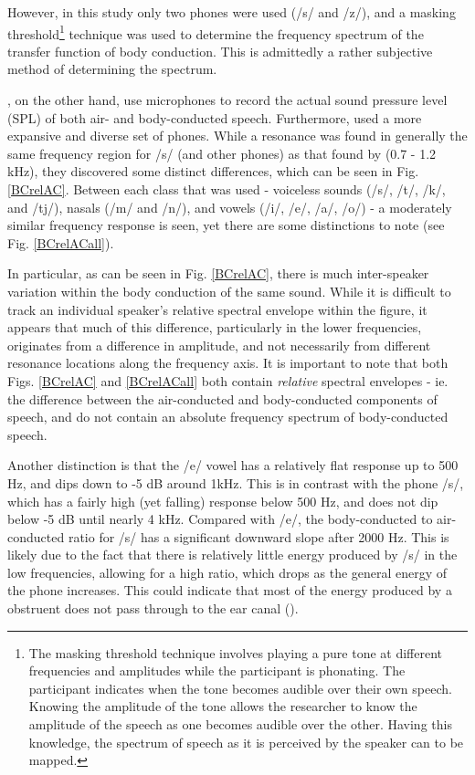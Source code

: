 However, in this study only two phones were used (/s/ and /z/), and a masking threshold\footnote{The masking threshold technique involves playing a pure tone at different frequencies and amplitudes while the participant is phonating. The participant indicates when the tone becomes audible over their own speech. Knowing the amplitude of the tone allows the researcher to know the amplitude of the speech as one becomes audible over the other. Having this knowledge, the spectrum of speech as it is perceived by the speaker can to be mapped.} technique was used to determine the frequency spectrum of the transfer function of body conduction.  This is admittedly a rather subjective method of determining the spectrum.  

\cite{reinfeldt:10}, on the other hand, use microphones to record the actual sound pressure level (SPL) of both air- and body-conducted speech. Furthermore, \cite{reinfeldt:10} used a more expansive and diverse set of phones.  While a resonance was found in generally the same frequency region for /s/ (and other phones) as that found by \cite{porschmann:00} (0.7 - 1.2 kHz), they discovered some distinct differences, which can be seen in Fig. \ref{BCrelAC}. Between each class that was used - voiceless sounds (/s/, /t/, /k/, and /tj/),  nasals (/m/ and /n/), and vowels (/i/, /e/, /a/, /o/) - a moderately similar frequency response is seen, yet there are some distinctions to note (see Fig. \ref{BCrelACall}).

In particular, as can be seen in Fig. \ref{BCrelAC}, there is much inter-speaker variation within the body conduction of the same sound.  While it is difficult to track an individual speaker's relative spectral envelope within the figure, it appears that much of this difference, particularly in the lower frequencies, originates from a difference in amplitude, and not necessarily from different resonance locations along the frequency axis.  It is important to note that both Figs. \ref{BCrelAC} and \ref{BCrelACall} both contain \textit{relative} spectral envelopes - ie. the difference between the air-conducted and body-conducted components of speech, and do not contain an absolute frequency spectrum of body-conducted speech. 

Another distinction is that the /e/ vowel has a relatively flat response up to 500 Hz, and dips down to -5 dB around 1kHz.  This is in contrast with the phone /s/, which has a fairly high (yet falling) response below 500 Hz, and does not dip below -5 dB until nearly 4 kHz.  Compared with /e/, the body-conducted to air-conducted ratio for /s/ has a significant downward slope after 2000 Hz.  This is likely due to the fact that there is relatively little energy produced by /s/ in the low frequencies, allowing for a high ratio, which drops as the general energy of the phone increases.  This could indicate that most of the energy produced by a obstruent does not pass through to the ear canal (\cite{reinfeldt:10}).

